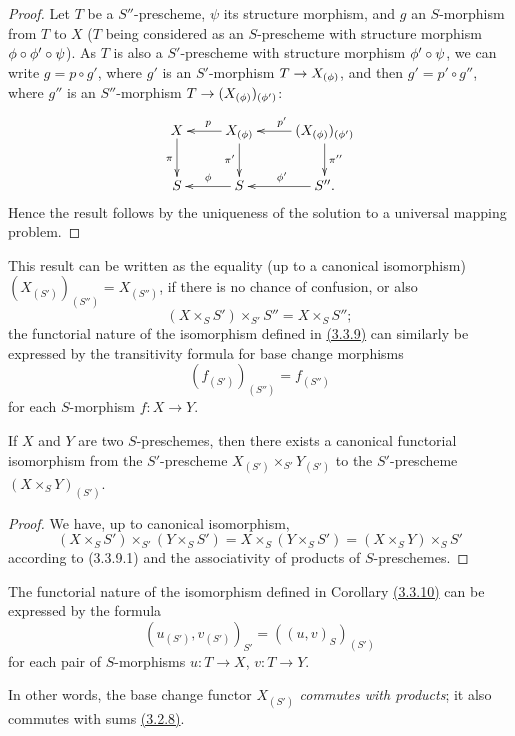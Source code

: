 \begin{proof}
\label{proof-prop-1.3.3.9}
Let $T$ be a $S''$-prescheme, $\psi$ its structure morphism, and $g$ an
$S$-morphism from $T$ to $X$ ($T$ being considered as an $S$-prescheme with
structure morphism $\phi\circ\phi'\circ\psi$). As $T$ is also a $S'$-prescheme
with structure morphism $\phi'\circ\psi$, we can write $g=p\circ g'$, where
$g'$ is an $S'$-morphism $T\to X_{(\phi)}$, and then $g'=p'\circ g''$, where
$g''$ is an $S''$-morphism $T\to(X_{(\phi)})_{(\phi')}$:
\[
  \xymatrix{
    X\ar[d]_\pi &
    X_{(\vphi)}\ar[l]_p\ar[d]_{\pi'} &
    (X_{(\vphi)})_{(\vphi')}\ar[l]_{p'}\ar[d]^{\pi''}\\
    S &
    S\ar[l]_\vphi &
    S''\ar[l]_{\vphi'}.
  }
\]
Hence the result follows by the uniqueness of the solution to a universal
mapping problem.
\end{proof}

This result can be written as the equality (up to a canonical isomorphism)
$(X_{(S')})_{(S'')}=X_{(S'')}$, if there is no chance of confusion, or also
\[
  (X\times_S S')\times_{S'}S''=X\times_S S'';
  \tag{3.3.9.1}
\]
the functorial nature of the isomorphism defined in \hyperref[prop-1.3.3.9]{(3.3.9)} can
similarly be expressed by the transitivity formula for base change morphisms
\[
  (f_{(S')})_{(S'')}=f_{(S'')}
  \tag{3.3.9.2}
\]
for each $S$-morphism $f:X\to Y$.

\begin{cor}[3.3.10]
\label{cor-1.3.3.10}
If $X$ and $Y$ are two $S$-preschemes, then there exists a canonical functorial
isomorphism from the $S'$-prescheme $X_{(S')}\times_{S'}Y_{(S')}$ to the
$S'$-prescheme $(X\times_S Y)_{(S')}$.
\end{cor}

\begin{proof}
\label{proof-cor-1.3.3.10}
We have, up to canonical isomorphism,
\[
  (X\times_S S')\times_{S'}(Y\times_S S')
  =X\times_S(Y\times_S S')=(X\times_S Y)\times_S S'
\]
according to (3.3.9.1) and the associativity of products of $S$-preschemes.
\end{proof}

The functorial nature of the isomorphism defined in
Corollary \hyperref[cor-1.3.3.10]{(3.3.10)} can be expressed by the formula
\[
  (u_{(S')},v_{(S')})_{S'}=((u,v)_S)_{(S')}
  \tag{3.3.10.1}
\]
for each pair of $S$-morphisms $u:T\to X$, $v:T\to Y$.

In other words, the base change functor $X_{(S')}$ {\em commutes with
products}; it also commutes with sums \hyperref[env-1.3.2.8]{(3.2.8)}.

